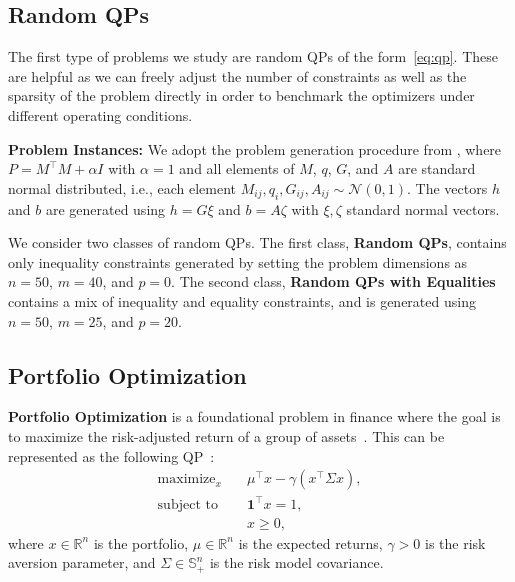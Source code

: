 \documentclass{article} %
\newcommand{\R}{\mathbb{R}}
\DeclareMathOperator*{\maximize}{maximize}
\DeclareMathOperator*{\st}{subject\ to}
\begin{document}
\subsection{Random QPs}

The first type of problems we study are random QPs of the form~\cref{eq:qp}. These are helpful as we can freely adjust the number of constraints as well as the sparsity of the problem directly in order to benchmark the optimizers under different operating conditions.

\textbf{Problem Instances:} We adopt the problem generation procedure from \citet{saravanos2025deep}, where $P = M^\top M + \alpha I$ with $\alpha = 1$ and all elements of $M$, $q$, $G$, and $A$ are standard normal distributed, i.e., each element $M_{ij}, q_i, G_{ij}, A_{ij} \sim \mathcal{N}(0, 1)$. The vectors $h$ and $b$ are generated using $h = G \xi$ and $b = A \zeta$ with $\xi, \zeta$ standard normal vectors.

We consider two classes of random QPs. The first class, \textbf{Random QPs}, contains only inequality constraints generated by setting the problem dimensions as $n = 50$, $m = 40$, and $p = 0$. The second class, \textbf{Random QPs with Equalities} contains a mix of inequality and equality constraints, and is generated using $n = 50$, $m = 25$, and $p = 20$.

\subsection{Portfolio Optimization}
\label{appendix:problem_classes:portfolio_opt}

\textbf{Portfolio Optimization} is a foundational problem in finance where the goal is to maximize the risk-adjusted return of a group of assets~\citep{markowitz1952portfolio,boyd2013performance,boyd2017multi}. This can be represented as the following QP~\citep{boyd2004convex,stellato2020osqp}:
\begin{subequations}
\begin{align}
    \maximize_x \quad            & \mu^\top x - \gamma (x^\top \Sigma x), \\
    \st \quad & \mathbf{1}^\top x = 1, \\
                            & x \geq 0,
\end{align}
\end{subequations}
where $x \in \R^n$ is the portfolio, $\mu \in \R^n$ is the expected returns, $\gamma > 0$ is the risk aversion parameter, and $\Sigma \in \mathbb{S}_+^n$ is the risk model covariance.
\end{document}
